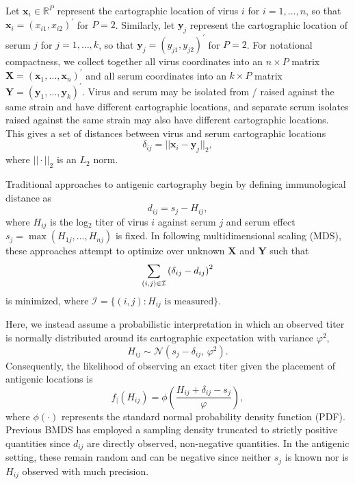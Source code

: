 \documentclass[11pt,oneside,letterpaper]{article}
\newcommand{\virus}{\mathbf{x}}						%
\newcommand{\serum}{\mathbf{y}}						%
\newcommand{\viruses}{\mathbf{X}}					%
\newcommand{\sera}{\mathbf{Y}}						%
\newcommand{\se}{s}									%
\newcommand{\point}{f_{\scriptscriptstyle \vert}}	%
\newcommand{\mdssd}{\varphi}						%
\newcommand{\vn}{n}									%
\newcommand{\sn}{k}									%
\newcommand{\normal}{\mathcal{N}}					%
\begin{document}
Let $\virus_i \in \mathbb{R}^{P}$ represent the cartographic location of virus $i$ for $i = 1,\ldots,\vn$, so that $\virus_i = (x_{i1}, x_{i2})^{\prime}$ for $P=2$. 
Similarly, let $\serum_j$ represent the cartographic location of serum $j$ for $j = 1,\ldots,\sn$, so that $\serum_j = (y_{j1},y_{j2})^{\prime}$ for $P=2$.
For notational compactness, we collect together all virus coordinates into an $\vn \times P$ matrix  $\viruses = (\virus_1, \ldots, \virus_{\vn})^{\prime}$ and all serum coordinates into an $\sn \times P$ matrix $\sera = (\serum_{1},\ldots,\serum_{\sn})^{\prime}$.
Virus and serum may be isolated from / raised against the same strain and have different cartographic locations, and separate serum isolates raised against the same strain may also have different cartographic locations. 
This gives a set of distances between virus and serum cartographic locations 
\begin{equation}
	\delta_{ij} =  || \virus_i - \serum_j ||_2,
\end{equation}
where $|| \cdot ||_2$ is an $L_2$ norm.

Traditional approaches to antigenic cartography \cite{Smith04} begin by defining immunological distance as
\begin{equation}
	d_{ij} =  \se_j - H_{ij},
\end{equation}
where $H_{ij}$ is the log$_2$ titer of virus $i$ against serum $j$ and serum effect $\se_j = \max ( H_{1j},\ldots,H_{\vn j} )$ is fixed.
In following multidimensional scaling (MDS), these approaches attempt to optimize over unknown $\viruses$ and $\sera$ such that
\begin{equation}
	\sum_{(i,j) \in \cal I} 
	\left(
		\delta_{ij} - d_{ij}
	\right)^2
\end{equation}
is minimized, where $\mathcal{I} = \{ (i,j) : H_{ij} \mbox{ is measured} \}$.

Here, we instead assume a probabilistic interpretation in which an observed titer is normally distributed around its cartographic expectation with variance $\mdssd^2$,
\begin{equation} \label{hij}
	H_{ij} \sim \normal( \se_j - \delta_{ij}, \, \mdssd^2 ).
\end{equation}
Consequently, the likelihood of observing an exact titer given the placement of antigenic locations is 
\begin{equation} 
	\point(H_{ij}) = \phi \left( \frac{ H_{ij} + \delta_{ij} - \se_j }{ \mdssd } \right),
\end{equation}
where $\phi(\cdot)$ represents the standard normal probability density function (PDF).
Previous BMDS has employed a sampling density truncated to strictly positive quantities since $d_{ij}$ are directly observed, non-negative quantities.  
In the antigenic setting, these remain random and can be negative since neither $\se_j$ is known nor is $H_{ij}$ observed with much precision. 
\end{document}
